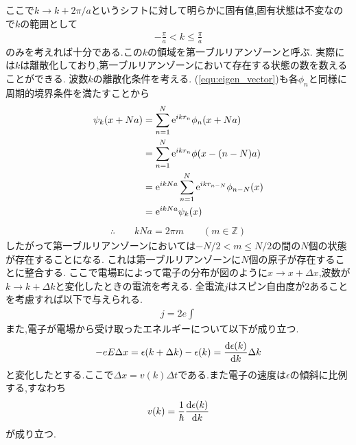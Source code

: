 ここで$k\rightarrow k+2\pi/a$というシフトに対して明らかに固有値,固有状態は不変なので$k$の範囲として
\begin{align}
  -\frac{\pi}{a}<k\leq\frac{\pi}{a}
\end{align}
のみを考えれば十分である.この$k$の領域を第一ブルリアンゾーンと呼ぶ.
実際には$k$は離散化しており,第一ブルリアンゾーンにおいて存在する状態の数を数えることができる.
波数$k$の離散化条件を考える.
(\ref{equ:eigen_vector})も各$\phi_n$と同様に周期的境界条件を満たすことから
\begin{align}
  \begin{split}
    \psi_k(x+Na)&=\sum_{n=1}^N{\rm e}^{ikr_n}\phi_n(x+Na)\\
    &=\sum_{n=1}^N{\rm e}^{ikr_n}\phi(x-(n-N)a)\\
    &={\rm e}^{ikNa}\sum_{n=1}^N{\rm e}^{ikr_{n-N}}\phi_{n-N}(x)\\
    &={\rm e}^{ikNa}\psi_k(x)\\
  \end{split}
\end{align}
\begin{align}
  \therefore\qquad kNa=2\pi m\qquad(m\in\mathbb{Z})
\end{align}
したがって第一ブルリアンゾーンにおいては$-N/2<m\leq N/2$の間の$N$個の状態が存在することになる.
これは第一ブルリアンゾーンに$N$個の原子が存在することに整合する.
ここで電場$\bm E$によって電子の分布が図のように$x\rightarrow x+\Delta x$,波数が$k\rightarrow k+\Delta k$と変化したときの電流を考える.
全電流$j$はスピン自由度が$2$あることを考慮すれば以下で与えられる.
\begin{align}
  j=2e\int
\end{align}
また,電子が電場から受け取ったエネルギーについて以下が成り立つ.
\begin{align}
  -eE\Delta x=\epsilon(k+\Delta k)-\epsilon(k)=\frac{{\rm d}\epsilon(k)}{{\rm d}k}\Delta k
\end{align}
と変化したとする.ここで$\Delta x=v(k)\Delta t$である.また電子の速度は$\epsilon$の傾斜に比例する,すなわち
\begin{align}
  v(k)=\frac{1}{\hbar}\frac{{\rm d}\epsilon(k)}{{\rm d}k}
\end{align}
が成り立つ.
